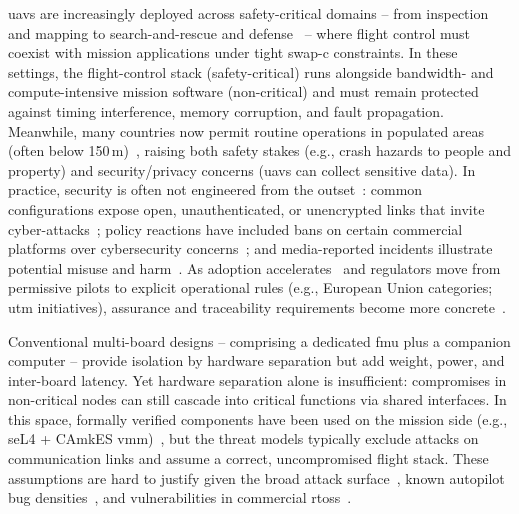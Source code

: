 \glspl{uav} are increasingly deployed across safety-critical domains -- from
inspection and mapping to search-and-rescue and
defense~\cite{silvagni_multipurpose_2017,lammers_airborne_2023,tsouros_review_2019,yu_uav-based_2022,dilshad_applications_2020,caroti_uav-borne_2017}
-- where
flight control must coexist with mission applications under tight \gls{swap-c}
constraints. In these settings, the flight-control stack (safety-critical) runs
alongside bandwidth- and compute-intensive mission software (non-critical) and
must remain protected against timing interference, memory corruption, and fault
propagation. Meanwhile, many countries now permit routine operations in populated
areas (often below 150\,m)~\cite{nassi2021sok}, raising both safety stakes
(e.g., crash hazards to people and property) and security/privacy concerns
(\glspl{uav} can collect sensitive data).
%
In practice,
security is often not engineered from the outset~\cite{leccadito2018survey}:
common configurations expose open, unauthenticated, or unencrypted links that
invite cyber-attacks~\cite{kishnaCyberVulnerUAVReview2017,mansfieldUAVCyberThreats2013};
policy reactions have included bans on certain commercial platforms over
cybersecurity concerns~\cite{suasNewsDjiDronesBanned2017}; and media-reported
incidents illustrate potential misuse and harm~\cite{spiegelUAVAccident2015,nytimesUAVAccident2018,theDriveUAVAccident2019}.
As adoption accelerates~\cite{mohsan2022towards} and regulators move from
permissive pilots to explicit operational rules (e.g., European Union categories; \gls{utm}
initiatives), assurance and traceability requirements become more
concrete~\cite{Ullah2020UAV5gEULegisl,glossner2021overview}.

Conventional multi-board designs -- comprising a dedicated \gls{fmu} plus a
companion computer -- provide isolation by hardware separation but add weight, power, and
inter-board latency. Yet hardware separation alone is insufficient:
compromises in non-critical nodes can still cascade into critical functions via
shared interfaces. In this space, formally verified components have been used on
the mission side (e.g., seL4 + CAmkES \gls{vmm})~\cite{klein_formally_2018},
but the threat models typically exclude attacks on communication links and
assume a correct, uncompromised flight stack. These assumptions are hard to
justify given the broad attack surface~\cite{nassi2021sok}, known autopilot bug
densities~\cite{wang_exploratory_2021}, and vulnerabilities in commercial
\glspl{rtos}~\cite{buquerin2018security}.

